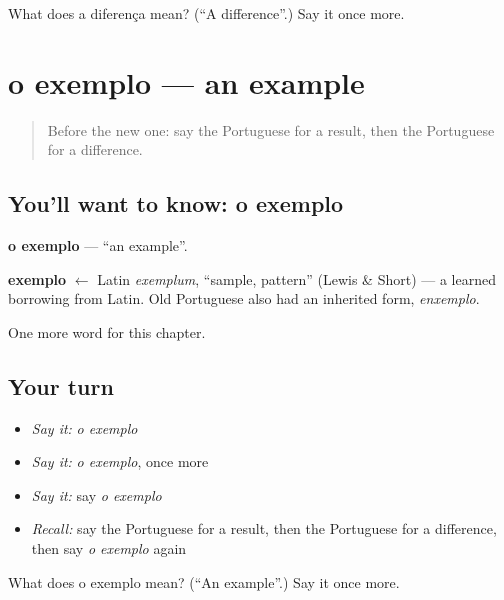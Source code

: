 \begin{tcolorbox}[breakable,colback=teal!4,colframe=teal!35!black,title={Before you move on}]
What does a diferença mean? (\textquotedblleft{}A difference\textquotedblright{}.) Say it once more.
\end{tcolorbox}
\section[o exemplo]{o exemplo — an example}

\label{lesson:PT-C161-exemplo}



\begin{quote}
Before the new one: say the Portuguese for a result, then the Portuguese for a difference.
\end{quote}

\subsection*{You'll want to know: o exemplo}
\textbf{o exemplo} — \textquotedblleft{}an example\textquotedblright{}.

\begin{cousinweb}
\textbf{exemplo} $\leftarrow$ Latin \emph{exemplum}, \textquotedblleft{}sample, pattern\textquotedblright{} (Lewis \& Short) — a learned borrowing from Latin. Old Portuguese also had an inherited form, \emph{enxemplo}.
\end{cousinweb}

\begin{grammarlens}[title={What you've built}]
One more word for this chapter.
\end{grammarlens}

\subsection*{Your turn}
\begin{itemize}
\raggedright
  \item \emph{Say it:} \emph{o exemplo}
  \item \emph{Say it:} \emph{o exemplo}, once more
  \item \emph{Say it:} say \emph{o exemplo}
  \item \emph{Recall:} say the Portuguese for a result, then the Portuguese for a difference, then say \emph{o exemplo} again
\end{itemize}

\begin{tcolorbox}[breakable,colback=teal!4,colframe=teal!35!black,title={Before you move on}]
What does o exemplo mean? (\textquotedblleft{}An example\textquotedblright{}.) Say it once more.
\end{tcolorbox}
